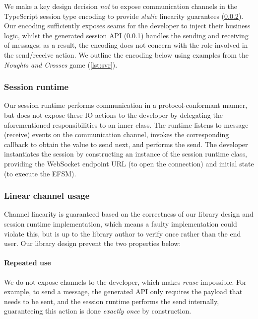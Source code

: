 We make a key design decision \textit{not} to expose communication channels in
the TypeScript session type encoding to provide \textit{static} linearity
guarantees (\cref{section:serverlinear}).
Our encoding sufficiently exposes seams for the developer to inject their
business logic, whilst the generated session API
(\cref{section:serversessionapi}) handles the sending and receiving of
messages;
as a result, the encoding does not concern with the role involved in the
send/receive action. We outline the encoding below using examples from the
\textit{Noughts and Crosses} game (\cref{lst:svr}).

\subsubsection{Session runtime}
\label{section:serversessionapi}

Our session runtime performs communication in a protocol-conformant manner, but
does not expose these IO actions to the developer by delegating the
aforementioned responsibilities to an inner class.
The runtime listens to message (receive) events on the communication channel,
invokes the corresponding callback to obtain the value to send next, and
performs the send.
The developer instantiates the session by constructing an instance of the
session runtime class, providing the WebSocket endpoint URL (to open the
connection) and initial state (to execute the EFSM).

\subsubsection{Linear channel usage}
\label{section:serverlinear}
Channel linearity is guaranteed based on the correctness of our library design
and session runtime implementation, which means a faulty implementation could
violate this, but is up to the library author to verify once rather than the
end user. Our library design prevent the two properties below:

\paragraph{Repeated use}
We do not expose channels to the developer, which makes \textit{reuse}
impossible.
For example, to send a message, the generated API only requires the payload
that needs to be sent, and the session runtime performs the send internally,
guaranteeing this action is done \textit{exactly once} by construction.

